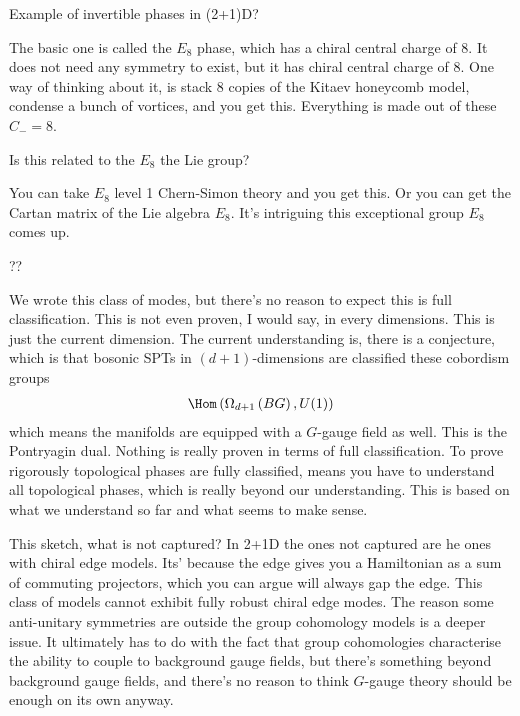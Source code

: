 \begin{question}
    Example of invertible phases in (2+1)D?
\end{question}
The basic one is called the $E_8$ phase,
which has a chiral central charge of 8.
It does not need any symmetry to exist,
but it has chiral central charge of 8.
One way of thinking about it,
is stack 8 copies of the Kitaev honeycomb model,
condense a bunch of vortices,
and you get this.
Everything is made out of these $C_{-}=8$.

\begin{question}
    Is this related to the $E_8$ the Lie group?
\end{question}
You can take $E_8$ level 1 Chern-Simon theory and you get this.
Or you can get the Cartan matrix of the Lie algebra $E_8$.
It's intriguing this exceptional group $E_8$ comes up.

\begin{question}
    ??
\end{question}
We wrote this class of modes,
but there's no reason to expect this is full classification.
This is not even proven,
I would say,
in every dimensions.
This is just the current dimension.
The current understanding is,
there is a conjecture,
which is that bosonic SPTs in $(d+1)$-dimensions
are classified these cobordism groups
\begin{align}
    \Hom\left(\Omega_{d+1}\left( BG \right), U(1)
    \right)
\end{align}
which means the manifolds are equipped with a $G$-gauge field as well.
This is the Pontryagin dual.
Nothing is really proven in terms of full classification.
To prove rigorously topological phases are fully classified,
means you have to understand all topological phases,
which is really beyond our understanding.
This is based on what we understand so far and what seems to make sense.


This sketch, what is not captured?
In 2+1D the ones not captured are he ones with chiral edge models.
Its' because the edge gives you a Hamiltonian as a sum of commuting projectors,
which you can argue will always gap the edge.
This class of models cannot exhibit fully robust chiral edge modes.
The reason some anti-unitary symmetries are outside the group cohomology models
is a deeper issue.
It ultimately has to do with the fact that group cohomologies characterise the
ability to couple to background gauge fields,
but there's something beyond background gauge fields,
and there's no reason to think $G$-gauge theory should be enough on its own
anyway.

